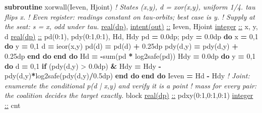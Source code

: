 \documentclass[10pt]{article}
\renewcommand{\_}{\origunderscore\allowbreak}
\newenvironment{Shaded}{}{}
\newcommand{\BuiltInTok}[1]{#1}
\newcommand{\CommentTok}[1]{\textit{#1}}
\newcommand{\DataTypeTok}[1]{\underline{#1}}
\newcommand{\DecValTok}[1]{#1}
\newcommand{\FloatTok}[1]{#1}
\newcommand{\FunctionTok}[1]{#1}
\newcommand{\KeywordTok}[1]{\textbf{#1}}
\newcommand{\NormalTok}[1]{#1}
\newcommand{\OperatorTok}[1]{#1}
\begin{document}
\begin{Shaded}
\begin{Highlighting}[]
  \KeywordTok{subroutine}\NormalTok{ xor\_wall(I\_even, H\_joint)}
    \CommentTok{! States (x,y), d = xor(x,y), uniform 1/4. tau flips x.}
    \CommentTok{! Even register: readings constant on tau{-}orbits; best case is y.}
    \CommentTok{! Supply at the seat: s = x, odd under tau.}
    \DataTypeTok{real(dp)}\NormalTok{, }\DataTypeTok{intent(out)} \DataTypeTok{::}\NormalTok{ I\_even, H\_joint}
    \DataTypeTok{integer} \DataTypeTok{::}\NormalTok{ x, y, d}
    \DataTypeTok{real(dp)} \DataTypeTok{::}\NormalTok{ pd(}\DecValTok{0}\NormalTok{:}\DecValTok{1}\NormalTok{), pdy(}\DecValTok{0}\NormalTok{:}\DecValTok{1}\NormalTok{,}\DecValTok{0}\NormalTok{:}\DecValTok{1}\NormalTok{), H\_d, H\_d\_y}
\NormalTok{    pd }\KeywordTok{=} \FloatTok{0.0\_dp}\NormalTok{; pdy }\KeywordTok{=} \FloatTok{0.0\_dp}
    \KeywordTok{do}\NormalTok{ x }\KeywordTok{=} \DecValTok{0}\NormalTok{,}\DecValTok{1}
       \KeywordTok{do}\NormalTok{ y }\KeywordTok{=} \DecValTok{0}\NormalTok{,}\DecValTok{1}
\NormalTok{          d }\KeywordTok{=} \BuiltInTok{ieor}\NormalTok{(x,y)}
\NormalTok{          pd(d)    }\KeywordTok{=}\NormalTok{ pd(d) }\KeywordTok{+} \FloatTok{0.25\_dp}
\NormalTok{          pdy(d,y) }\KeywordTok{=}\NormalTok{ pdy(d,y) }\KeywordTok{+} \FloatTok{0.25\_dp}
       \KeywordTok{end do}
    \KeywordTok{end do}
\NormalTok{    H\_d }\KeywordTok{=} \KeywordTok{{-}}\FunctionTok{sum}\NormalTok{(pd }\KeywordTok{*}\NormalTok{ log2safe(pd))}
\NormalTok{    H\_d\_y }\KeywordTok{=} \FloatTok{0.0\_dp}
    \KeywordTok{do}\NormalTok{ y }\KeywordTok{=} \DecValTok{0}\NormalTok{,}\DecValTok{1}
       \KeywordTok{do}\NormalTok{ d }\KeywordTok{=} \DecValTok{0}\NormalTok{,}\DecValTok{1}
          \KeywordTok{if}\NormalTok{ (pdy(d,y) }\OperatorTok{\textgreater{}} \FloatTok{0.0\_dp}\NormalTok{) }\KeywordTok{\&}
\NormalTok{             H\_d\_y }\KeywordTok{=}\NormalTok{ H\_d\_y }\KeywordTok{{-}}\NormalTok{ pdy(d,y)}\KeywordTok{*}\NormalTok{log2safe(pdy(d,y)}\KeywordTok{/}\FloatTok{0.5\_dp}\NormalTok{)}
       \KeywordTok{end do}
    \KeywordTok{end do}
\NormalTok{    I\_even }\KeywordTok{=}\NormalTok{ H\_d }\KeywordTok{{-}}\NormalTok{ H\_d\_y}
    \CommentTok{! Joint: enumerate the conditional p(d | x,y) and verify it is a point}
    \CommentTok{! mass for every pair: the coalition decides the target exactly.}
\NormalTok{    block}
      \DataTypeTok{real(dp)} \DataTypeTok{::}\NormalTok{ pdxy(}\DecValTok{0}\NormalTok{:}\DecValTok{1}\NormalTok{,}\DecValTok{0}\NormalTok{:}\DecValTok{1}\NormalTok{,}\DecValTok{0}\NormalTok{:}\DecValTok{1}\NormalTok{)}
      \DataTypeTok{integer} \DataTypeTok{::}\NormalTok{ cnt}

\end{Highlighting}
\end{Shaded}
\end{document}
